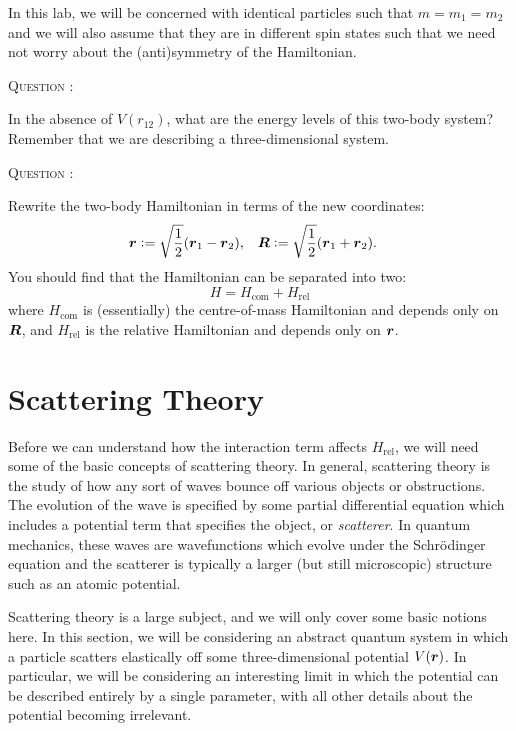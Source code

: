 \documentclass[
  a4paper,             %
  11pt,                %
  oneside,             %
  onecolumn,           %
  bibliography=totoc,  %
  final,               %
]{scrartcl}
\newcounter{question}
\newenvironment{question}{%
  \stepcounter{question}%
  \begin{tcolorbox}[
      colframe=black,
      sharp corners=all,
      boxsep=0.5ex,
    ]
    \noindent\textsc{\large Question \arabic{question}:} %
}{%
  \end{tcolorbox}%
}
\begin{document}
In this lab, we will be concerned with identical particles such that \(m = m_{1}
= m_{2} \) and we will also assume that they are in different spin states such
that we need not worry about the (anti)symmetry of the Hamiltonian.

\begin{question}
  In the absence of \(V(r_{12})\), what are the energy levels of this two-body
  system?  Remember that we are describing a three-dimensional system.
\end{question}

\begin{question}
  Rewrite the two-body Hamiltonian in terms of the new coordinates:
  \begin{align}
    \boldsymbol{r} &\vcentcolon= \sqrt{\frac{1}{2}} (\boldsymbol{r}_{1} - \boldsymbol{r}_{2}), &
    \boldsymbol{R} &\vcentcolon= \sqrt{\frac{1}{2}} (\boldsymbol{r}_{1} + \boldsymbol{r}_{2}).
  \end{align}
  You should find that the Hamiltonian can be separated into two:
  \begin{equation}
    \label{eq:hamiltonian_com_rel}
    H = H_{\text{com}} + H_{\text{rel}}
  \end{equation}
  where \(H_{\text{com}}\) is (essentially) the centre-of-mass Hamiltonian and
  depends only on \(\boldsymbol{R}\), and \(H_{\text{rel}}\) is the relative Hamiltonian
  and depends only on \(\boldsymbol{r}\).
\end{question}

\cleardoublepage
\section{Scattering Theory}
\label{sec:scattering_theory}

Before we can understand how the interaction term affects \(H_{\text{rel}}\), we
will need some of the basic concepts of scattering theory.  In general,
scattering theory is the study of how any sort of waves bounce off various
objects or obstructions.  The evolution of the wave is specified by some partial
differential equation which includes a potential term that specifies the object,
or \emph{scatterer}.  In quantum mechanics, these waves are wavefunctions which
evolve under the Schr\"odinger equation and the scatterer is typically a
larger (but still microscopic) structure such as an atomic potential.

Scattering theory is a large subject, and we will only cover some basic notions
here.  In this section, we will be considering an abstract quantum system in
which a particle scatters elastically off some three-dimensional potential
\(V(\boldsymbol{r})\).  In particular, we will be considering an interesting limit in
which the potential can be described entirely by a single parameter, with all
other details about the potential becoming irrelevant.
\end{document}
